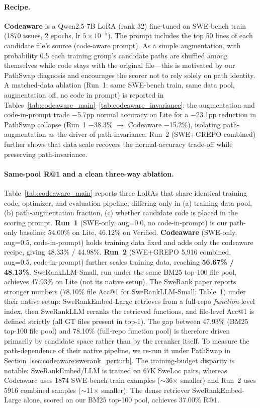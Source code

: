 \documentclass{article}
\begin{document}
\paragraph{Recipe.}
\textbf{Codeaware} is a Qwen2.5-7B LoRA (rank 32) fine-tuned on SWE-bench train (1870 issues, 2 epochs, lr $5{\times}10^{-5}$). The prompt includes the top 50 lines of each candidate file's source (code-aware prompt). As a simple augmentation, with probability 0.5 each training group's candidate paths are shuffled among themselves while code stays with the original file---this is motivated by our PathSwap diagnosis and encourages the scorer not to rely solely on path identity. A matched-data ablation (Run~1: same SWE-bench train, same data pool, augmentation off, no code in prompt) is reported in Tables~\ref{tab:codeaware_main}--\ref{tab:codeaware_invariance}: the augmentation and code-in-prompt trade $-$5.7pp normal accuracy on Lite for a $-$23.1pp reduction in PathSwap collapse (Run~1 $-$38.3\% $\to$ Codeaware $-$15.2\%), isolating path-augmentation as the driver of path-invariance. Run~2 (SWE+GREPO combined) further shows that data scale recovers the normal-accuracy trade-off while preserving path-invariance.

\paragraph{Same-pool R@1 and a clean three-way ablation.}
Table~\ref{tab:codeaware_main} reports three LoRAs that share identical training code, optimizer, and evaluation pipeline, differing only in (a) training data pool, (b) path-augmentation fraction, (c) whether candidate code is placed in the scoring prompt.
\textbf{Run~1} (SWE-only, aug=0.0, no code-in-prompt) is our path-only baseline: 54.00\% on Lite, 46.12\% on Verified.
\textbf{Codeaware} (SWE-only, aug=0.5, code-in-prompt) holds training data fixed and adds only the codeaware recipe, giving 48.33\% / 44.98\%.
\textbf{Run~2} (SWE+GREPO 5{,}916 combined, aug=0.5, code-in-prompt) further scales training data, reaching \textbf{56.67\% / 48.13\%}.
SweRankLLM-Small, run under the same BM25 top-100 file pool, achieves 47.93\% on Lite (not its native setup).
The SweRank paper reports stronger numbers (78.10\% file Acc@1 for SweRankLLM-Small; \citealt{reddy2025swerank} Table~1) under their native setup: SweRankEmbed-Large retrieves from a full-repo \emph{function}-level index, then SweRankLLM reranks the retrieved functions, and file-level Acc@1 is defined strictly (all GT files present in top-1). The gap between 47.93\% (BM25 top-100 file pool) and 78.10\% (full-repo function pool) is therefore driven primarily by candidate space rather than by the reranker itself. To measure the path-dependence of their native pipeline, we re-run it under PathSwap in Section~\ref{sec:codeaware:swerank_perturb}.
The training-budget disparity is notable: SweRankEmbed/LLM is trained on 67K SweLoc pairs, whereas Codeaware uses 1874 SWE-bench-train examples ($\sim$36$\times$ smaller) and Run~2 uses 5916 combined samples ($\sim$11$\times$ smaller).
The dense retriever SweRankEmbed-Large alone, scored on our BM25 top-100 pool, achieves 37.00\% R@1.
\end{document}
